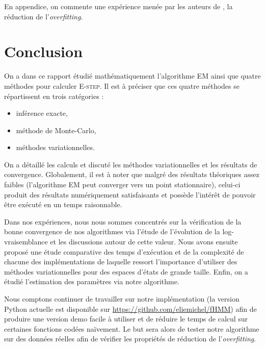 \documentclass[10pt,a4paper]{article}
\newcommand{\Estep}{\textsc{E-step}}
\newcommand{\EM}{\textsc{EM}}
\begin{document}
En appendice, on commente une expérience menée par les auteurs de
\cite{ghahramani1997factorial}, la réduction de l'\emph{overfitting}.

\section{Conclusion}

On a dans ce rapport étudié mathématiquement l'algorithme \EM{} ainsi que quatre
méthodes pour calculer \Estep{}.
Il est à préciser que ces quatre méthodes se répartissent en trois catégories : 
\begin{itemize}
\item inférence exacte,
\item méthode de Monte-Carlo,
\item méthodes variationnelles.
\end{itemize}

On a détaillé les calculs et discuté les méthodes variationnelles et les
résultats de convergence.
Globalement, il est à noter que malgré des résultats théoriques assez faibles
(l'algorithme \EM{} peut converger vers un point stationnaire), celui-ci
produit des résultats numériquement satisfaisants et possède l'intérêt
de pouvoir être exécuté en un temps raisonnable.

Dans nos expériences, nous nous sommes concentrés sur la vérification de la
bonne convergence de nos algorithmes via l'étude de l'évolution de la
log-vraisemblance et les discussions autour de cette valeur.
Nous avons ensuite proposé une étude comparative des temps d'exécution et de la
complexité de chacune des implémentations de laquelle ressort l'importance
d'utiliser des méthodes variationnelles pour des espaces d'états de grande
taille.
Enfin, on a étudié l'estimation des paramètres via notre algorithme.

Nous comptons continuer de travailler sur notre implémentation (la version
Python actuelle est disponible sur \url{https://github.com/eliemichel/fHMM})
afin de produire une version demo facile à utiliser et de réduire le temps de
calcul sur certaines fonctions codées naïvement.
Le but sera alors de tester notre algorithme sur des données réelles afin de
vérifier les propriétés de réduction de l'\emph{overfitting}.





\newpage

\end{document}
